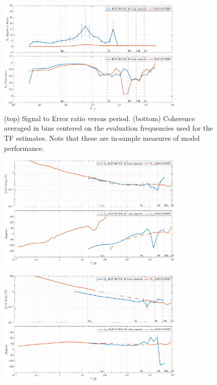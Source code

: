 \documentclass{article}
\begin{document}
\begin{figure}[h!]
\centering
\includegraphics[width=0.8\textwidth]{figures/KAP103/SN_compare-E_x.pdf}
\caption{(top) Signal to Error ratio versus period. (bottom) Coherence averaged in bins centered on the evaluation frequencies used for the TF estimates. Note that these are in-sample measures of model performance.}
\label{fig:universe}
\end{figure}

\begin{figure}[h!]
\centering
\includegraphics[width=0.8\textwidth]{figures/KAP103/transferfnZ_compare-Z_xx_Magnitude_Phase.pdf}
\caption{}
\end{figure}


\begin{figure}[h!]
\centering
\includegraphics[width=0.8\textwidth]{figures/KAP103/transferfnZ_compare-Z_xy_Magnitude_Phase.pdf}
\caption{}
\label{fig:universe}
\end{figure}
\end{document}
